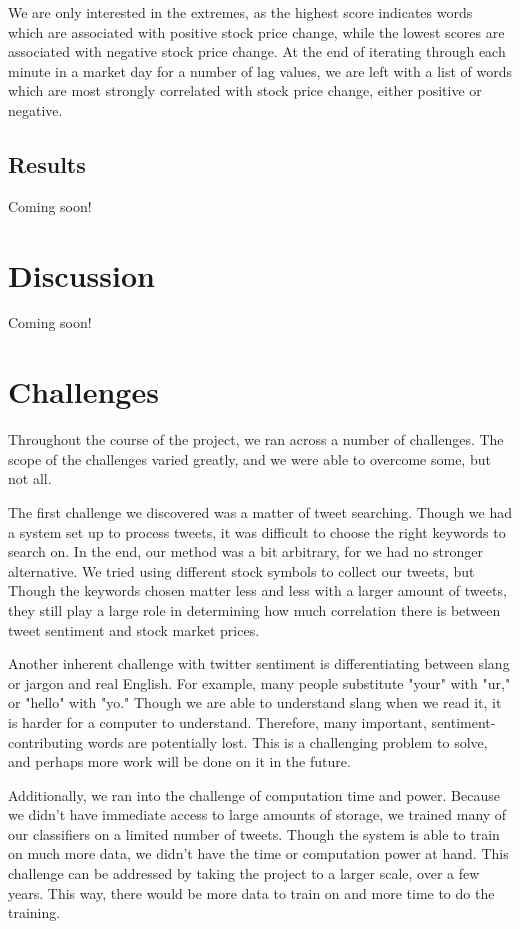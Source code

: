 \documentclass[preprint,pre,floats,aps,amsmath,amssymb,12pt]{revtex4}
\begin{document}
We are only interested in the extremes, as the highest score indicates words which are associated with positive stock price change, while the lowest scores are associated with negative stock price change. At the end of iterating through each minute in a market day for a number of lag values, we are left with a list of words which are most strongly correlated with stock price change, either positive or negative. 

\subsection{Results}
Coming soon!

\section{Discussion}
\label{sec:disc}

Coming soon!

\section{Challenges}
\label{sec:chal}

Throughout the course of the project, we ran across a number of challenges. The scope of the challenges varied greatly, and we were able to overcome some, but not all. 

The first challenge we discovered was a matter of tweet searching. Though we had a system set up to process tweets, it was difficult to choose the right keywords to search on. In the end, our method was a bit arbitrary, for we had no stronger alternative. We tried using different stock symbols to collect our tweets, but Though the keywords chosen matter less and less with a larger amount of tweets, they still play a large role in determining how much correlation there is between tweet sentiment and stock market prices. 

Another inherent challenge with twitter sentiment is differentiating between slang or jargon and real English. For example, many people substitute "your" with "ur," or "hello" with "yo." Though we are able to understand slang when we read it, it is harder for a computer to understand. Therefore, many important, sentiment-contributing words are potentially lost. This is a challenging problem to solve, and perhaps more work will be done on it in the future. 

Additionally, we ran into the challenge of computation time and power. Because we didn't have immediate access to large amounts of storage, we trained many of our classifiers on a limited number of tweets. Though the system is able to train on much more data, we didn't have the time or computation power at hand. This challenge can be addressed by taking the project to a larger scale, over a few years. This way, there would be more data to train on and more time to do the training. 
\end{document}

